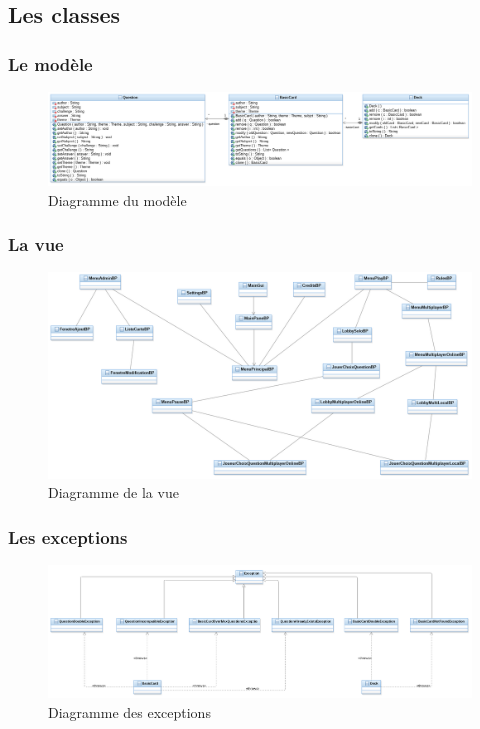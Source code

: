 \newpage
\subsection{Les classes}

\subsubsection{Le modèle}
\begin{figure}[h]
	\centering
	\includegraphics[width=\textwidth]{ttmc_modele.png}
	\caption{Diagramme du modèle}
	\label{fig:diag_modele}
\end{figure}

\subsubsection{La vue}
\begin{figure}[h]
	\centering
	\includegraphics[width=\textwidth]{ttmc_vue.png}
	\caption{Diagramme de la vue}
	\label{fig:diag_vue}
\end{figure}

\newpage
\subsubsection{Les exceptions}

\begin{figure}[h]
	\centering
	\includegraphics[width=\textwidth]{ttmc_exception.png}
	\caption{Diagramme des exceptions}
	\label{fig:diag_exception}
\end{figure}

